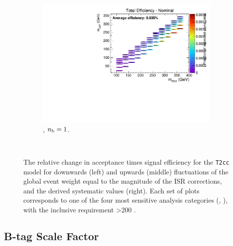 \begin{figure}[ht!]
\begin{subfigure}[b]{0.32\textwidth}
    \includegraphics[width=\textwidth, page=6]{Figs/sms/t2cc/v24/ISR_T2cc_v24_eq1b_ge4j_incl.pdf}
    \caption{\njhigh, $n_{\text{b}} = 1$.}
  \end{subfigure}\\
  \caption{The relative change in acceptance times signal efficiency for the
  \texttt{T2cc} model for downwards (left) and upwards (middle) fluctuations
  of the global event weight equal to the magnitude of the ISR corrections,
  and the derived systematic values (right). Each set of plots corresponds
  to one of the four most sensitive analysis categories (\nb, \nj), with the
  inclusive requirement \HT>200 \gev.}
  \label{fig:sms-isr-t2cc}
\end{figure}


\newpage
\subsection*{B-tag Scale Factor}
\label{sec:t2cc_btag_plots}

